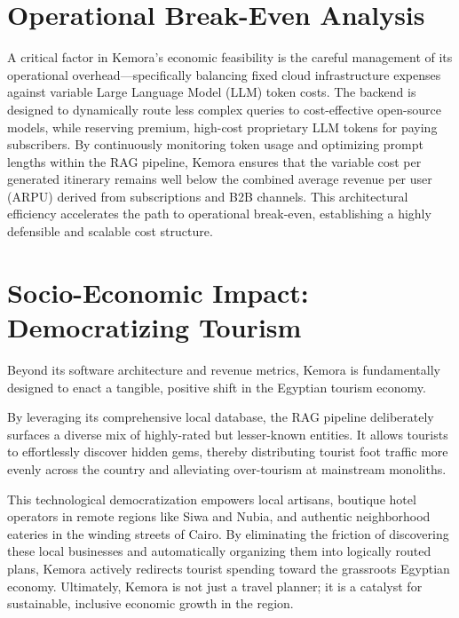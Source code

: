 \section{Operational Break-Even Analysis}
A critical factor in Kemora's economic feasibility is the careful management of its operational overhead—specifically balancing fixed cloud infrastructure expenses against variable Large Language Model (LLM) token costs. The backend is designed to dynamically route less complex queries to cost-effective open-source models, while reserving premium, high-cost proprietary LLM tokens for paying subscribers. By continuously monitoring token usage and optimizing prompt lengths within the RAG pipeline, Kemora ensures that the variable cost per generated itinerary remains well below the combined average revenue per user (ARPU) derived from subscriptions and B2B channels. This architectural efficiency accelerates the path to operational break-even, establishing a highly defensible and scalable cost structure.

\section{Socio-Economic Impact: Democratizing Tourism}
Beyond its software architecture and revenue metrics, Kemora is fundamentally designed to enact a tangible, positive shift in the Egyptian tourism economy. 

By leveraging its comprehensive local database, the RAG pipeline deliberately surfaces a diverse mix of highly-rated but lesser-known entities. It allows tourists to effortlessly discover hidden gems, thereby distributing tourist foot traffic more evenly across the country and alleviating over-tourism at mainstream monoliths.

This technological democratization empowers local artisans, boutique hotel operators in remote regions like Siwa and Nubia, and authentic neighborhood eateries in the winding streets of Cairo. By eliminating the friction of discovering these local businesses and automatically organizing them into logically routed plans, Kemora actively redirects tourist spending toward the grassroots Egyptian economy. Ultimately, Kemora is not just a travel planner; it is a catalyst for sustainable, inclusive economic growth in the region.
